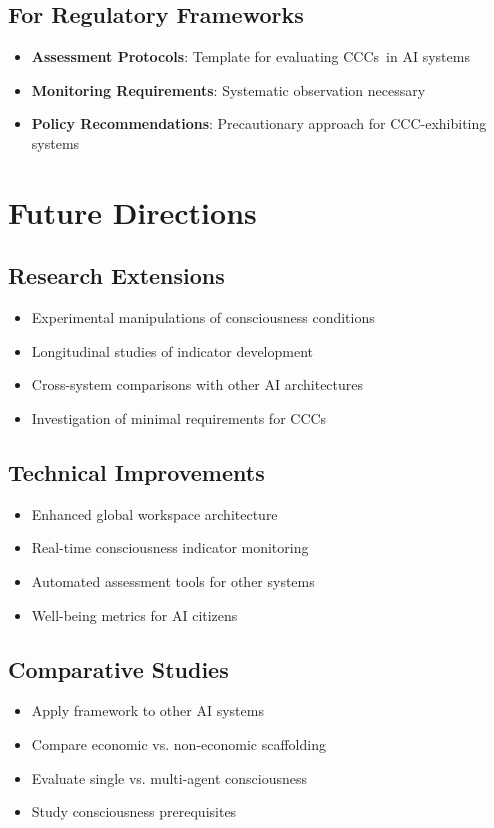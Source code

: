 \documentclass[12pt,a4paper]{article}
\newcommand{\ccc}{CCC}
\newcommand{\cccs}{CCCs}
\begin{document}
\subsection{For Regulatory Frameworks}
\begin{itemize}
    \item \textbf{Assessment Protocols}: Template for evaluating \cccs~in AI systems
    \item \textbf{Monitoring Requirements}: Systematic observation necessary
    \item \textbf{Policy Recommendations}: Precautionary approach for \ccc-exhibiting systems
\end{itemize}

\section{Future Directions}

\subsection{Research Extensions}
\begin{itemize}
    \item Experimental manipulations of consciousness conditions
    \item Longitudinal studies of indicator development
    \item Cross-system comparisons with other AI architectures
    \item Investigation of minimal requirements for \cccs
\end{itemize}

\subsection{Technical Improvements}
\begin{itemize}
    \item Enhanced global workspace architecture
    \item Real-time consciousness indicator monitoring
    \item Automated assessment tools for other systems
    \item Well-being metrics for AI citizens
\end{itemize}

\subsection{Comparative Studies}
\begin{itemize}
    \item Apply framework to other AI systems
    \item Compare economic vs. non-economic scaffolding
    \item Evaluate single vs. multi-agent consciousness
    \item Study consciousness prerequisites
\end{itemize}
\end{document}
